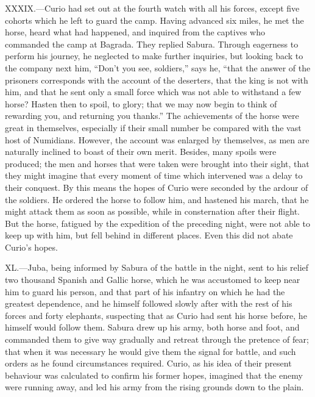 XXXIX.—Curio had set out at the fourth watch with all his forces,
except five cohorts which he left to guard the camp. Having advanced six
miles, he met the horse, heard what had happened, and inquired from the
captives who commanded the camp at Bagrada. They replied Sabura. Through
eagerness to perform his journey, he neglected to make further
inquiries, but looking back to the company next him, ``Don't you see,
soldiers,'' says he, ``that the answer of the prisoners corresponds with
the account of the deserters, that the king is not with him, and that he
sent only a small force which was not able to withstand a few horse?
Hasten then to spoil, to glory; that we may now begin to think of
rewarding you, and returning you thanks.'' The achievements of the horse
were great in themselves, especially if their small number be compared
with the vast host of Numidians. However, the account was enlarged by
themselves, as men are naturally inclined to boast of their own merit.
Besides, many spoils were produced; the men and horses that were taken
were brought into their sight, that they might imagine that every moment
of time which intervened was a delay to their conquest. By this means
the hopes of Curio were seconded by the ardour of the soldiers. He
ordered the horse to follow him, and hastened his march, that he might
attack them as soon as possible, while in consternation after their
flight. But the horse, fatigued by the expedition of the preceding
night, were not able to keep up with him, but fell behind in different
places. Even this did not abate Curio's hopes.

XL.—Juba, being informed by Sabura of the battle in the night, sent to
his relief two thousand Spanish and Gallic horse, which he was
accustomed to keep near him to guard his person, and that part of his
infantry on which he had the greatest dependence, and he himself
followed slowly after with the rest of his forces and forty elephants,
suspecting that as Curio had sent his horse before, he himself would
follow them. Sabura drew up his army, both horse and foot, and commanded
them to give way gradually and retreat through the pretence of fear;
that when it was necessary he would give them the signal for battle, and
such orders as he found circumstances required. Curio, as his idea of
their present behaviour was calculated to confirm his former hopes,
imagined that the enemy were running away, and led his army from the
rising grounds down to the plain.

